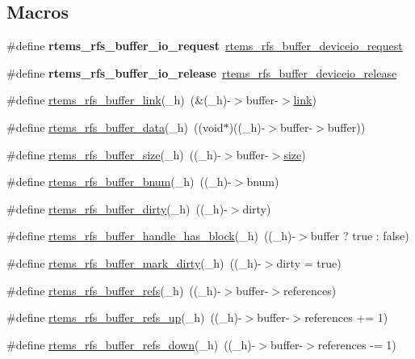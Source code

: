 \subsection*{Macros}
\begin{DoxyCompactItemize}
\item 
\mbox{\label{rtems-rfs-buffer_8h_ad721fbac05d9722e86823a37be95e473}} 
\#define {\bfseries rtems\+\_\+rfs\+\_\+buffer\+\_\+io\+\_\+request}~\mbox{\hyperlink{rtems-rfs-buffer_8h_ace9647e355198f86ffd4d637b9ddb900}{rtems\+\_\+rfs\+\_\+buffer\+\_\+deviceio\+\_\+request}}
\item 
\mbox{\label{rtems-rfs-buffer_8h_aa6c398be3359dd07fa6b4fc23672ab7f}} 
\#define {\bfseries rtems\+\_\+rfs\+\_\+buffer\+\_\+io\+\_\+release}~\mbox{\hyperlink{rtems-rfs-buffer_8h_a93fca5a06bf0618e3ced9c3f1d167178}{rtems\+\_\+rfs\+\_\+buffer\+\_\+deviceio\+\_\+release}}
\item 
\#define \mbox{\hyperlink{rtems-rfs-buffer_8h_a1d8f88aa8f5bf93f53163ab4e5c9a3de}{rtems\+\_\+rfs\+\_\+buffer\+\_\+link}}(\+\_\+h)~(\&(\+\_\+h)-\/$>$buffer-\/$>$\mbox{\hyperlink{link_8c_a8c94afd0b7e5bb4ce95fefd964241f7f}{link}})
\item 
\#define \mbox{\hyperlink{rtems-rfs-buffer_8h_aeb8816b42da7435346c907b381188402}{rtems\+\_\+rfs\+\_\+buffer\+\_\+data}}(\+\_\+h)~((void$\ast$)((\+\_\+h)-\/$>$buffer-\/$>$buffer))
\item 
\#define \mbox{\hyperlink{rtems-rfs-buffer_8h_a61b3830c7a42a4f4eeacf65415083e36}{rtems\+\_\+rfs\+\_\+buffer\+\_\+size}}(\+\_\+h)~((\+\_\+h)-\/$>$buffer-\/$>$\mbox{\hyperlink{sun4u_2tte_8h_a245260f6f74972558f61b85227df5aae}{size}})
\item 
\#define \mbox{\hyperlink{rtems-rfs-buffer_8h_a033ed348d383f050ca39826a7d651b6b}{rtems\+\_\+rfs\+\_\+buffer\+\_\+bnum}}(\+\_\+h)~((\+\_\+h)-\/$>$bnum)
\item 
\#define \mbox{\hyperlink{rtems-rfs-buffer_8h_a89510f87db8455d566eceb93e73141ae}{rtems\+\_\+rfs\+\_\+buffer\+\_\+dirty}}(\+\_\+h)~((\+\_\+h)-\/$>$dirty)
\item 
\#define \mbox{\hyperlink{rtems-rfs-buffer_8h_a5ed1947b948ae286c8f7010bba2587e1}{rtems\+\_\+rfs\+\_\+buffer\+\_\+handle\+\_\+has\+\_\+block}}(\+\_\+h)~((\+\_\+h)-\/$>$buffer ? true \+: false)
\item 
\#define \mbox{\hyperlink{rtems-rfs-buffer_8h_a79aed6fb6f1fb4d118c2197184800ddc}{rtems\+\_\+rfs\+\_\+buffer\+\_\+mark\+\_\+dirty}}(\+\_\+h)~((\+\_\+h)-\/$>$dirty = true)
\item 
\#define \mbox{\hyperlink{rtems-rfs-buffer_8h_ab507313ddcfdbc27f2837d5655b81256}{rtems\+\_\+rfs\+\_\+buffer\+\_\+refs}}(\+\_\+h)~((\+\_\+h)-\/$>$buffer-\/$>$references)
\item 
\#define \mbox{\hyperlink{rtems-rfs-buffer_8h_ab7a683a0d8d62ca1dcad8bc715cdcef2}{rtems\+\_\+rfs\+\_\+buffer\+\_\+refs\+\_\+up}}(\+\_\+h)~((\+\_\+h)-\/$>$buffer-\/$>$references += 1)
\item 
\#define \mbox{\hyperlink{rtems-rfs-buffer_8h_a5dedbca1ff6273273639eae1353f7447}{rtems\+\_\+rfs\+\_\+buffer\+\_\+refs\+\_\+down}}(\+\_\+h)~((\+\_\+h)-\/$>$buffer-\/$>$references -\/= 1)
\end{DoxyCompactItemize}

